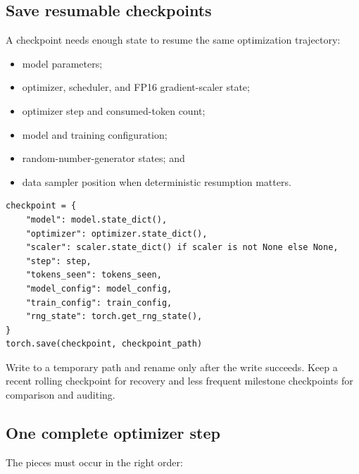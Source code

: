 \subsection{Save resumable checkpoints}

A checkpoint needs enough state to resume the same optimization trajectory:

\begin{itemize}
  \setlength{\itemsep}{0pt}
  \item model parameters;
  \item optimizer, scheduler, and FP16 gradient-scaler state;
  \item optimizer step and consumed-token count;
  \item model and training configuration;
  \item random-number-generator states; and
  \item data sampler position when deterministic resumption matters.
\end{itemize}

\begin{lstlisting}[style=shadedpython]
checkpoint = {
    "model": model.state_dict(),
    "optimizer": optimizer.state_dict(),
    "scaler": scaler.state_dict() if scaler is not None else None,
    "step": step,
    "tokens_seen": tokens_seen,
    "model_config": model_config,
    "train_config": train_config,
    "rng_state": torch.get_rng_state(),
}
torch.save(checkpoint, checkpoint_path)
\end{lstlisting}

Write to a temporary path and rename only after the write succeeds. Keep a
recent rolling checkpoint for recovery and less frequent milestone
checkpoints for comparison and auditing.

\subsection{One complete optimizer step}

The pieces must occur in the right order:

